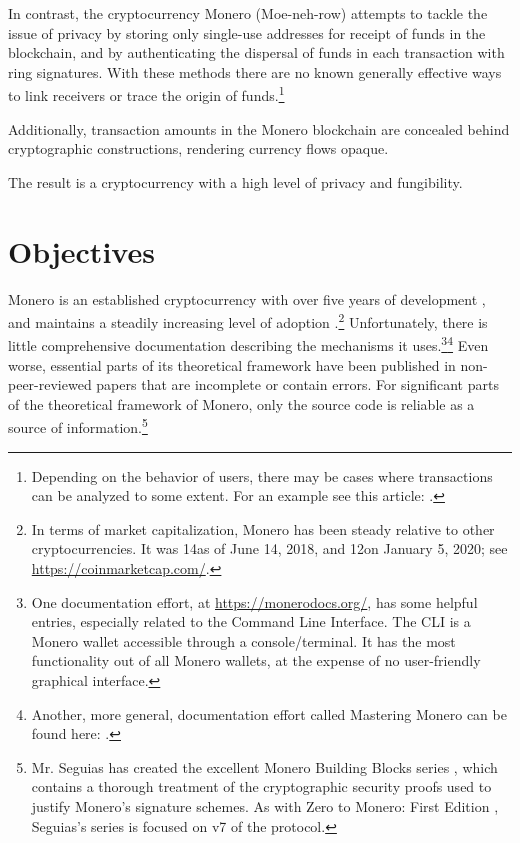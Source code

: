 In contrast, the cryptocurrency Monero (Moe-neh-row) attempts to tackle the issue of privacy by storing only single-use addresses for receipt of funds in the blockchain, and by authenticating the dispersal of funds in each transaction with ring signatures. With these methods there are no known generally effective ways to link receivers or trace the origin of funds.\footnote{Depending on the behavior of users, there may be cases where transactions can be analyzed to some extent. For an example see this article: \cite{monero-ring-heuristics-ryo}.}

Additionally, transaction amounts in the Monero blockchain are concealed behind cryptographic constructions, rendering currency flows opaque.

The result is a cryptocurrency with a high level of privacy and fungibility.



\section{Objectives}
\label{sec:goals}

Monero is an established cryptocurrency with over five years of development \cite{bitmonero-launched, monero-history}, and maintains a steadily increasing level of adoption \cite{justin-defcon-2019-community-growth}.\footnote{\label{marketcap_note}In terms of market capitalization, Monero has been steady relative to other cryptocurrencies. It was 14\nth as of June 14\nth, 2018, and 12\nth on January 5\nth, 2020; see \url{https://coinmarketcap.com/}.} Unfortunately, there is little comprehensive documentation describing the mechanisms it uses.\footnote{One documentation effort, at \url{https://monerodocs.org/}, has some helpful entries, especially related to the Command Line Interface. The CLI is a Monero wallet accessible through a console/terminal. It has the most functionality out of all Monero wallets, at the expense of no user-friendly graphical interface.}\footnote{Another, more general, documentation effort called Mastering Monero can be found here: \cite{mastering-monero}.} Even worse, essential parts of its theoretical framework have been published in non-peer-reviewed papers that are incomplete or contain errors. For significant parts of the theoretical framework of Monero, only the source code is reliable as a source of information.\footnote{Mr. Seguias has created the excellent Monero Building Blocks series \cite{monero-building-blocks}, which contains a thorough treatment of the cryptographic security proofs used to justify Monero's signature schemes. As with Zero to Monero: First Edition \cite{ztm-1}, Seguias's series is focused on v7 of the protocol.}


